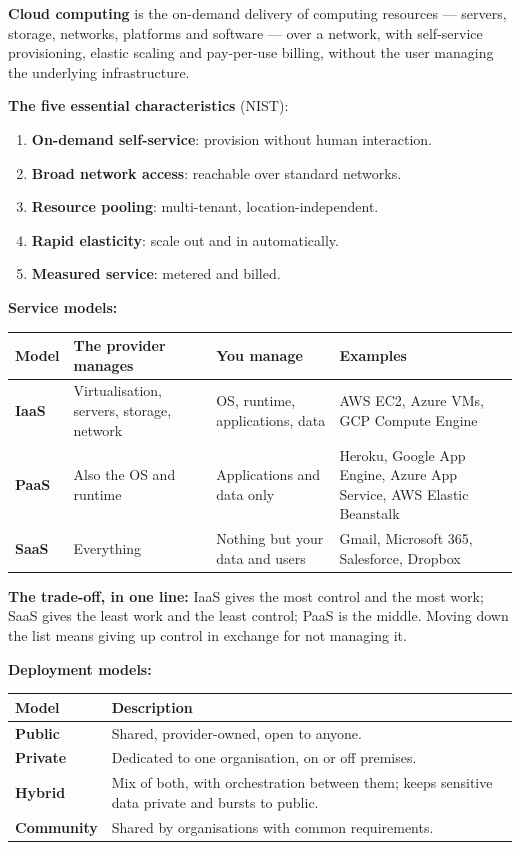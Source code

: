 \documentclass[11pt,a4paper]{article}
\begin{document}
\begin{solbox}
\textbf{Cloud computing} is the on-demand delivery of computing resources --- servers, storage, networks, platforms and software --- over a network, with self-service provisioning, elastic scaling and pay-per-use billing, without the user managing the underlying infrastructure.

\textbf{The five essential characteristics} (NIST):
\begin{enumerate}
\item \textbf{On-demand self-service}: provision without human interaction.
\item \textbf{Broad network access}: reachable over standard networks.
\item \textbf{Resource pooling}: multi-tenant, location-independent.
\item \textbf{Rapid elasticity}: scale out and in automatically.
\item \textbf{Measured service}: metered and billed.
\end{enumerate}

\textbf{Service models:}
\begin{center}\small
\begin{tabularx}{\textwidth}{>{\bfseries}p{} X X p{}}
\toprule Model & The provider manages & You manage & Examples\\
\midrule
IaaS & Virtualisation, servers, storage, network & OS, runtime, applications, data & AWS EC2, Azure VMs, GCP Compute Engine\\
PaaS & Also the OS and runtime & Applications and data only & Heroku, Google App Engine, Azure App Service, AWS Elastic Beanstalk\\
SaaS & Everything & Nothing but your data and users & Gmail, Microsoft 365, Salesforce, Dropbox\\
\bottomrule
\end{tabularx}
\end{center}

\textbf{The trade-off, in one line:} IaaS gives the most control and the most work; SaaS gives the least work and the least control; PaaS is the middle. Moving down the list means giving up control in exchange for not managing it.

\textbf{Deployment models:}
\begin{center}\small
\begin{tabularx}{\textwidth}{>{\bfseries}p{} X}
\toprule Model & Description\\
\midrule
Public & Shared, provider-owned, open to anyone.\\
Private & Dedicated to one organisation, on or off premises.\\
Hybrid & Mix of both, with orchestration between them; keeps sensitive data private and bursts to public.\\
Community & Shared by organisations with common requirements.\\
\bottomrule
\end{tabularx}
\end{center}
\end{solbox}
\end{document}

